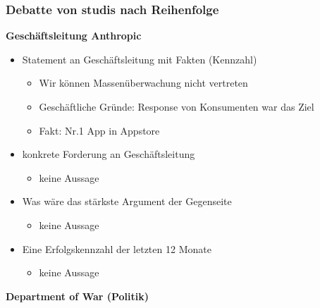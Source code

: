 \subsubsection{Debatte von studis nach Reihenfolge}

\textbf{Geschäftsleitung Anthropic}
\begin{itemize}
    \item Statement an Geschäftsleitung mit Fakten (Kennzahl) 
    \begin{itemize}
        \item Wir können Massenüberwachung nicht vertreten
        \item Geschäftliche Gründe: Response von Konsumenten war das Ziel
        \item Fakt: Nr.1 App in Appstore
    \end{itemize}
    \item konkrete Forderung an Geschäftsleitung
    \begin{itemize}
        \item keine Aussage
    \end{itemize}
    \item Was wäre das stärkste Argument der Gegenseite
    \begin{itemize}
        \item keine Aussage
    \end{itemize}
    \item Eine Erfolgskennzahl der letzten 12 Monate
    \begin{itemize}
        \item keine Aussage
    \end{itemize}
\end{itemize}
\textbf{Department of War (Politik)}
